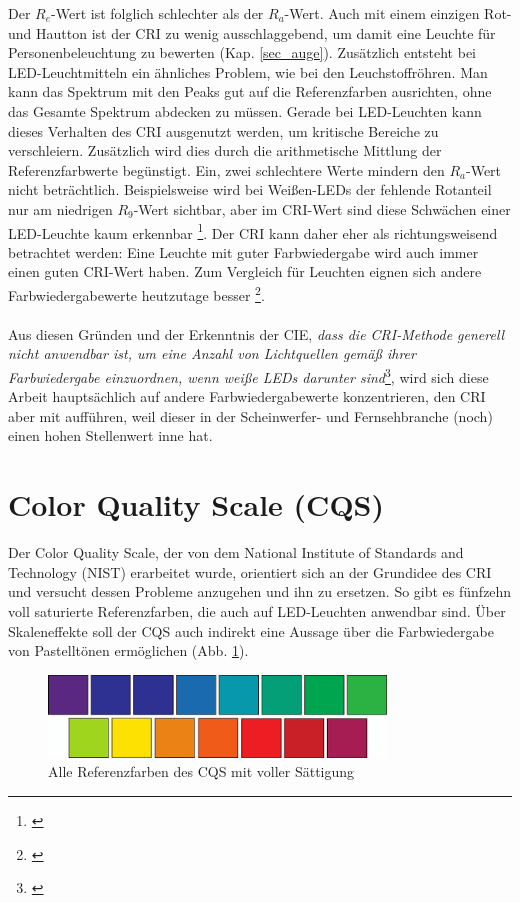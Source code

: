 Der $R_{e}$-Wert ist folglich schlechter als der $R_{a}$-Wert. Auch mit einem einzigen Rot- und Hautton ist der CRI zu wenig ausschlaggebend, um damit eine Leuchte für Personenbeleuchtung zu bewerten (Kap. \ref{sec_auge}). Zusätzlich entsteht bei LED-Leuchtmitteln ein ähnliches Problem, wie bei den Leuchstoffröhren. Man kann das Spektrum mit den Peaks gut auf die Referenzfarben ausrichten, ohne das Gesamte Spektrum abdecken zu müssen. Gerade bei LED-Leuchten kann dieses Verhalten des CRI ausgenutzt werden, um kritische Bereiche zu verschleiern. Zusätzlich wird dies durch die arithmetische Mittlung der Referenzfarbwerte begünstigt. Ein, zwei schlechtere Werte mindern den $R_{a}$-Wert nicht beträchtlich. Beispielsweise wird bei Weißen-LEDs  der fehlende Rotanteil nur am niedrigen $R_{9}$-Wert sichtbar, aber im CRI-Wert sind diese Schwächen einer LED-Leuchte kaum erkennbar \footnote{\cite{davis_ohno}}. Der CRI kann daher eher als richtungsweisend betrachtet werden: Eine Leuchte mit guter Farbwiedergabe wird auch immer einen guten CRI-Wert haben. Zum Vergleich für Leuchten eignen sich andere Farbwiedergabewerte heutzutage besser \footnote{\cite{production partner}}.\\\\
Aus diesen Gründen und der Erkenntnis der CIE, \emph{\glqq dass die CRI-Methode generell nicht anwendbar ist, um eine Anzahl von Lichtquellen gemäß ihrer Farbwiedergabe einzuordnen, wenn weiße LEDs darunter sind\grqq}\footnote{\citep[VI]{CIE}}, wird sich diese Arbeit hauptsächlich auf andere Farbwiedergabewerte konzentrieren, den CRI aber mit aufführen, weil dieser in der Scheinwerfer- und Fernsehbranche (noch) einen hohen Stellenwert inne hat.

\section{Color Quality Scale (CQS)} \label{sec_cqs}

Der Color Quality Scale, der von dem National Institute of Standards and Technology (NIST) erarbeitet wurde, orientiert sich an der Grundidee des CRI und versucht dessen Probleme anzugehen und ihn zu ersetzen. So gibt es fünfzehn voll saturierte Referenzfarben, die auch auf LED-Leuchten anwendbar sind. Über Skaleneffekte soll der CQS auch indirekt eine Aussage über die Farbwiedergabe von Pastelltönen ermöglichen (Abb. \ref{b_cqs1}). 

\begin{figure}[htp]     %
\centering
\includegraphics[width=0.8\textwidth]{bilder/cqs} 
\caption {Alle Referenzfarben des CQS mit voller Sättigung\protect\footnotemark}\label{b_cqs1}
\end{figure}


